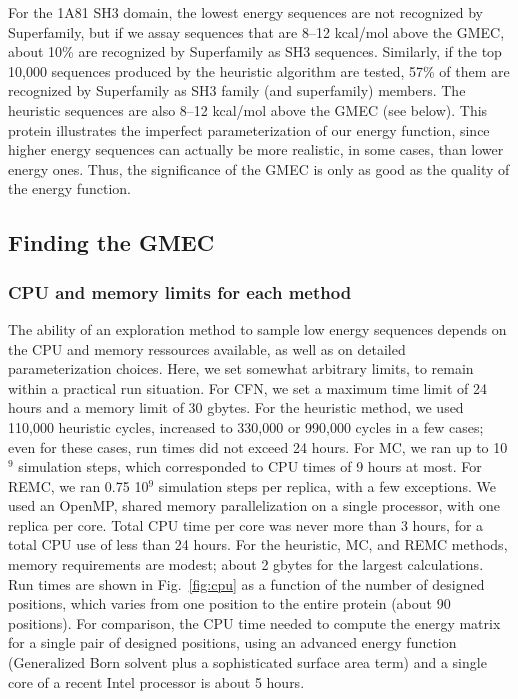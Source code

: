 \documentclass[a4paper,12pt]{article}
\begin{document}
For the 1A81 SH3 domain, the lowest energy sequences are not recognized by Superfamily, but if we assay sequences
that are 8--12 kcal/mol above the GMEC, about 10\% are recognized by Superfamily as SH3 sequences. Similarly, if the
top 10,000 sequences produced by the heuristic algorithm are tested, 57\% of them are recognized by Superfamily as SH3
family (and superfamily) members. The heuristic sequences are also 8--12 kcal/mol above the GMEC (see below). This
protein illustrates the imperfect parameterization of our energy function, since higher energy sequences can actually
be more realistic, in some cases, than lower energy ones. Thus, the significance of the GMEC is only as good as the
quality of the energy function.

\subsection{Finding the GMEC}
\subsubsection{CPU and memory limits for each method}
The ability of an exploration method to sample low energy sequences depends on the CPU and memory ressources
available, as well as on detailed parameterization choices. Here, we set somewhat arbitrary limits, to remain
within a practical run situation. For CFN, we set a maximum time limit of 24 hours and a memory limit of 30
gbytes. For the heuristic method, we used 110,000 heuristic cycles, increased to 330,000 or 990,000 cycles in a
few cases; even for these cases, run times did not exceed 24 hours. For MC, we ran up to 10$^9$ simulation steps,
which corresponded to CPU times of 9 hours at most. For REMC, we ran 0.75 10$^9$ simulation steps per replica,
with a few exceptions. We used an OpenMP, shared memory parallelization on a single processor, with one replica
per core. Total CPU time per core was never more than 3 hours, for a total CPU use of less than 24 hours. For the
heuristic, MC, and REMC methods, memory requirements are modest; about 2 gbytes for the largest calculations. Run
times are shown in Fig.\ \ref{fig:cpu} as a function of the number of designed positions, which varies from
one position to the entire protein (about 90 positions). For comparison, the CPU time needed to compute the
energy matrix for a single pair of designed positions, using an advanced energy function (Generalized Born
solvent plus a sophisticated surface area term) and a single core of a recent Intel processor is about 5 hours.
\end{document}
